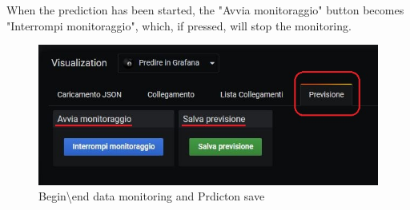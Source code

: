 When the prediction has been started, the "Avvia monitoraggio" button becomes "Interrompi monitoraggio", which, if pressed, will stop the monitoring.

\begin{figure}[H]
\centering
\includegraphics[scale=0.95]{img/plug-in/save_previsione.jpg}
\caption{Begin\textbackslash end data monitoring and Prdicton save}

\end{figure} 
 

